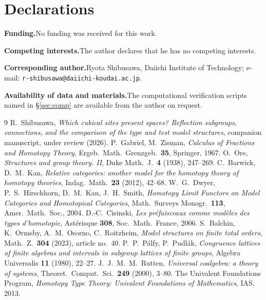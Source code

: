 \documentclass[11pt]{amsart}
\theoremstyle{definition}
\begin{document}
\section*{Declarations}

\noindent\textbf{Funding.}\quad No funding was received for this work.

\noindent\textbf{Competing interests.}\quad The author declares that he has
no competing interests.

\noindent\textbf{Corresponding author.}\quad Ryota Shibusawa, Daiichi
Institute of Technology; e-mail: \texttt{r-shibusawa@daiichi-koudai.ac.jp}.

\noindent\textbf{Availability of data and materials.}\quad The computational
verification scripts named in \S\ref{sec:comp} are available from the author
on request.

\begin{thebibliography}{9}
 R.~Shibusawa, \emph{Which cubical sites present spaces?
Reflection subgroups, connections, and the comparison of the type and test model
structures}, companion manuscript, under review (2026).
 P.~Gabriel, M.~Zisman, \emph{Calculus of Fractions and Homotopy
Theory}, Ergeb.\ Math.\ Grenzgeb.\ \textbf{35}, Springer, 1967.
 O.~Ore, \emph{Structures and group theory. II}, Duke Math.\ J.\
\textbf{4} (1938), 247--269.
 C.~Barwick, D.~M.~Kan, \emph{Relative categories: another
model for the homotopy theory of homotopy theories}, Indag.\ Math.\ \textbf{23}
(2012), 42--68.
 W.~G.~Dwyer, P.~S.~Hirschhorn, D.~M.~Kan, J.~H.~Smith,
\emph{Homotopy Limit Functors on Model Categories and Homotopical Categories},
Math.\ Surveys Monogr.\ \textbf{113}, Amer.\ Math.\ Soc., 2004.
 D.-C.~Cisinski, \emph{Les pr\'efaisceaux comme mod\`eles des
types d'homotopie}, Ast\'erisque \textbf{308}, Soc.\ Math.\ France, 2006.
\bibitem{Balchin} S.~Balchin, K.~Ormsby, A.~M.~Osorno, C.~Roitzheim,
\emph{Model structures on finite total orders}, Math.\ Z.\ \textbf{304} (2023),
article no.~40.
 P.~P.~P\'alfy, P.~Pudl\'ak, \emph{Congruence lattices of
finite algebras and intervals in subgroup lattices of finite groups}, Algebra
Universalis \textbf{11} (1980), 22--27.
 J.~J.~M.~M.~Rutten, \emph{Universal coalgebra: a theory of
systems}, Theoret.\ Comput.\ Sci.\ \textbf{249} (2000), 3--80.
 The Univalent Foundations Program, \emph{Homotopy Type
Theory: Univalent Foundations of Mathematics}, IAS, 2013.
\end{thebibliography}
\end{document}
